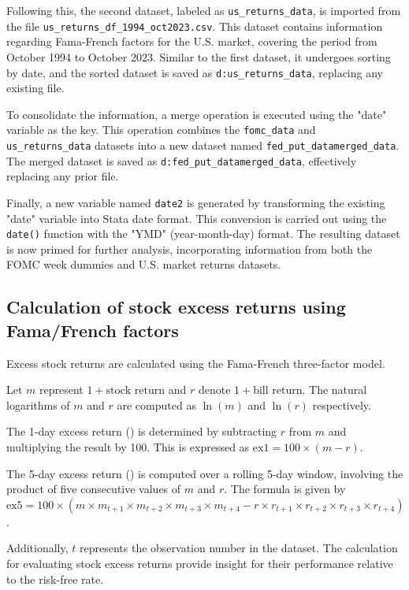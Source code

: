 Following this, the second dataset, labeled as \texttt{us\_returns\_data}, is imported from the file \texttt{us\_returns\_df\_1994\_oct2023.csv}. This dataset contains information regarding Fama-French factors for the U.S. market, covering the period from October 1994 to October 2023. Similar to the first dataset, it undergoes sorting by date, and the sorted dataset is saved as \texttt{d:us\_returns\_data}, replacing any existing file.

To consolidate the information, a merge operation is executed using the "date" variable as the key. This operation combines the \texttt{fomc\_data} and \texttt{us\_returns\_data} datasets into a new dataset named \texttt{fed\_put\_datamerged\_data}. The merged dataset is saved as \texttt{d:fed\_put\_datamerged\_data}, effectively replacing any prior file.

Finally, a new variable named \texttt{date2} is generated by transforming the existing "date" variable into Stata date format. This conversion is carried out using the \texttt{date()} function with the "YMD" (year-month-day) format. The resulting dataset is now primed for further analysis,  incorporating information from both the FOMC week dummies and U.S. market returns datasets.

\subsection{Calculation of stock excess returns using Fama/French factors}

Excess stock returns are calculated using the Fama-French three-factor model. 

Let \(m\) represent \(1 + \text{{stock return}}\) and \(r\) denote \(1 + \text{{bill return}}\). The natural logarithms of \(m\) and \(r\) are computed as \(\ln(m)\) and \(\ln(r)\) respectively.

The 1-day excess return () is determined by subtracting \(r\) from \(m\) and multiplying the result by 100. This is expressed as \(\text{{ex1}} = 100 \times (m - r)\). 

The 5-day excess return () is computed over a rolling 5-day window, involving the product of five consecutive values of \(m\) and \(r\). The formula is given by \(\text{{ex5}} = 100 \times (m \times m_{t+1} \times m_{t+2} \times m_{t+3} \times m_{t+4} - r \times r_{t+1} \times r_{t+2} \times r_{t+3} \times r_{t+4})\).

Additionally, \(t\) represents the observation number in the dataset. 
The calculation for evaluating stock excess returns provide insight for their 
performance relative to the risk-free rate.

